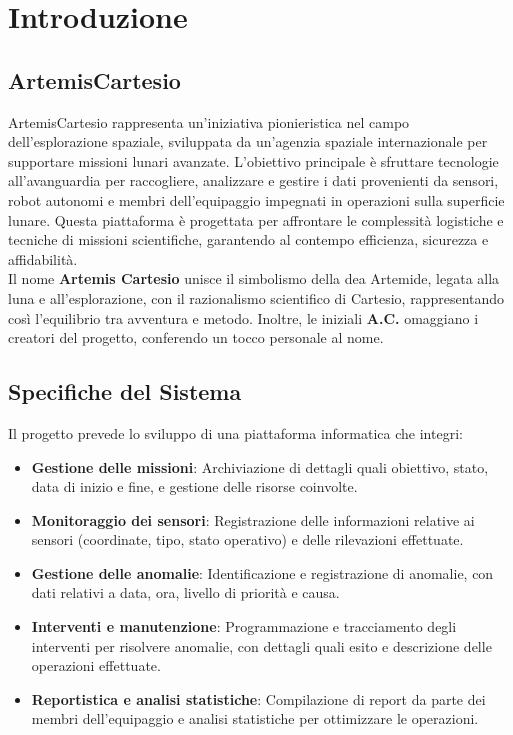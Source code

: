 \section{Introduzione}

\subsection{ArtemisCartesio}

ArtemisCartesio rappresenta un'iniziativa pionieristica nel campo dell'esplorazione spaziale, sviluppata da un'agenzia spaziale internazionale per supportare missioni lunari avanzate. L'obiettivo principale è sfruttare tecnologie all'avanguardia per raccogliere, analizzare e gestire i dati provenienti da sensori, robot autonomi e membri dell'equipaggio impegnati in operazioni sulla superficie lunare. Questa piattaforma è progettata per affrontare le complessità logistiche e tecniche di missioni scientifiche, garantendo al contempo efficienza, sicurezza e affidabilità.\\

\noindent
Il nome \textbf{Artemis Cartesio} unisce il simbolismo della dea Artemide, legata alla luna e all’esplorazione, con il razionalismo scientifico di Cartesio, rappresentando così l’equilibrio tra avventura e metodo. Inoltre, le iniziali \textbf{A.C.} omaggiano i creatori del progetto, conferendo un tocco personale al nome.

\subsection{Specifiche del Sistema}

Il progetto prevede lo sviluppo di una piattaforma informatica che integri:
\begin{itemize}
    \item \textbf{Gestione delle missioni}: Archiviazione di dettagli quali obiettivo, stato, data di inizio e fine, e gestione delle risorse coinvolte.
    \item \textbf{Monitoraggio dei sensori}: Registrazione delle informazioni relative ai sensori (coordinate, tipo, stato operativo) e delle rilevazioni effettuate.
    \item \textbf{Gestione delle anomalie}: Identificazione e registrazione di anomalie, con dati relativi a data, ora, livello di priorità e causa.
    \item \textbf{Interventi e manutenzione}: Programmazione e tracciamento degli interventi per risolvere anomalie, con dettagli quali esito e descrizione delle operazioni effettuate.
    \item \textbf{Reportistica e analisi statistiche}: Compilazione di report da parte dei membri dell'equipaggio e analisi statistiche per ottimizzare le operazioni.
\end{itemize}

